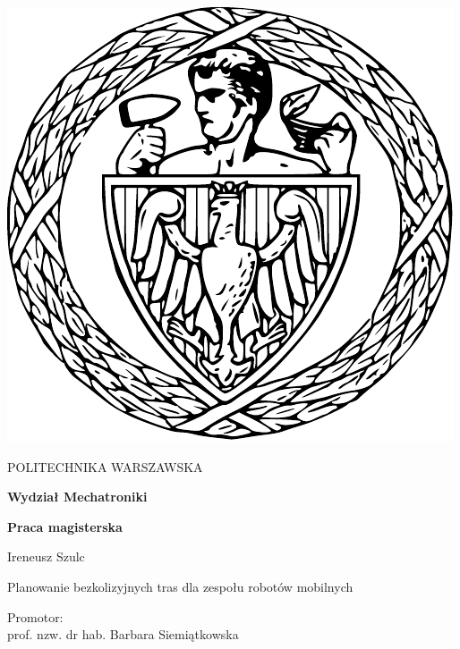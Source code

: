 
\thispagestyle {empty}

\begin{center}
	\includegraphics[scale=0.4]{img/pw}
	
	\vspace{0.5cm}
	
	{\fontsize{20}{20}\selectfont POLITECHNIKA WARSZAWSKA}
	
	\vspace{1.0cm}
	
	\textbf{{\fontsize{14}{14}\selectfont Wydział Mechatroniki}}
	
	\vspace{1.5cm}
	
	\textbf{{\fontsize{14}{14}\selectfont Praca magisterska}}

	\vspace{2.0cm}
	
	{\fontsize{14}{14}\selectfont Ireneusz Szulc}
	
	\vspace{1cm}
	
	{\fontsize{28}{28}\selectfont Planowanie bezkolizyjnych tras dla zespołu robotów mobilnych}
	
	\vspace{1cm}
	\begin{flushright}
		{\fontsize{14}{14}\selectfont Promotor: \\ 
		prof. nzw. dr hab. Barbara Siemiątkowska
		}
	

\end{flushright}
\end{center}
